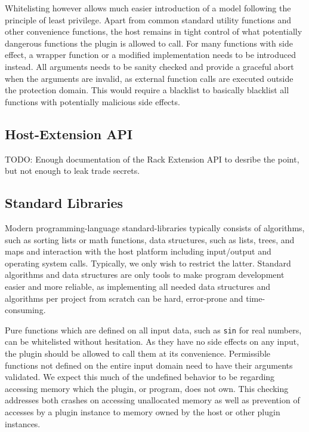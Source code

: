 Whitelisting however allows much easier introduction of a model following the
principle of least privilege. Apart from common standard utility functions and
other convenience functions, the host remains in tight control of what
potentially dangerous functions the plugin is allowed to call. For many
functions with side effect, a wrapper function or a modified implementation
needs to be introduced instead. All arguments needs to be sanity checked and
provide a graceful abort when the arguments are invalid, as external function
calls are executed outside the protection domain. This would require a blacklist
to basically blacklist all functions with potentially malicious side effects.

\subsection {Host-Extension API}

TODO: Enough documentation of the Rack Extension API to desribe the point, but
not enough to leak trade secrets.

\subsection {Standard Libraries}

Modern programming-language standard-libraries typically consists of algorithms,
such as sorting lists or math functions, data structures, such as lists, trees,
and maps and interaction with the host platform including input/output and
operating system calls. Typically, we only wish to restrict the latter. Standard
algorithms and data structures are only tools to make program development easier
and more reliable, as implementing all needed data structures and algorithms per
project from scratch can be hard, error-prone and time-consuming.

Pure functions which are defined on all input data, such as \texttt{sin} for
real numbers, can be whitelisted without hesitation. As they have no side
effects on any input, the plugin should be allowed to call them at its
convenience. Permissible functions not defined on the entire input domain need
to have their arguments validated. We expect this much of the undefined behavior
to be regarding accessing memory which the plugin, or program, does not own.
This checking addresses both crashes on accessing unallocated memory as well as
prevention of accesses by a plugin instance to memory owned by the host or other
plugin instances.


